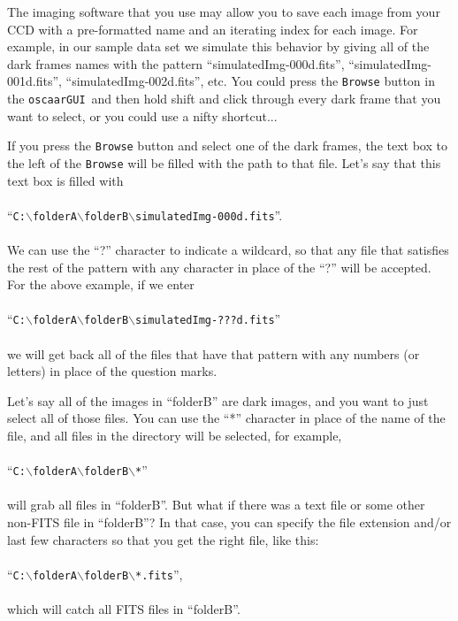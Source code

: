 \documentclass[a4paper]{article}
\newcommand{\code}[1]{\texttt{#1}}
\newcommand{\gui}{\code{oscaarGUI}~}
\begin{document}
The imaging software that you use may allow you to save each image from your CCD with a pre-formatted name and an iterating index for each image. For example, in our sample data set we simulate this behavior by giving all of the dark frames names with the pattern ``simulatedImg-000d.fits'', ``simulatedImg-001d.fits'', ``simulatedImg-002d.fits'', etc. You could press the \code{Browse} button in the \gui and then hold shift and click through every dark frame that you want to select, or you could use a nifty shortcut...

If you press the \code{Browse} button and select one of the dark frames, the text box to the left of the \code{Browse} will be filled with the path to that file. Let's say that this text box is filled with 
\\\\
\noindent``\code{C:$\backslash$folderA$\backslash$folderB$\backslash$simulatedImg-000d.fits}''. 
\\\\
\noindent We can use the ``?'' character to indicate a wildcard, so that any file that satisfies the rest of the pattern with any character in place of the ``?'' will be accepted. For the above example, if we enter 
\\\\
\noindent ``\code{C:$\backslash$folderA$\backslash$folderB$\backslash$simulatedImg-???d.fits}'' 
\\\\
\noindent we will get back all of the files that have that pattern with any numbers (or letters) in place of the question marks. 

Let's say all of the images in ``folderB'' are dark images, and you want to just select all of those files. You can use the ``*'' character in place of the name of the file, and all files in the directory will be selected, for example, 
\\\\
\noindent ``\code{C:$\backslash$folderA$\backslash$folderB$\backslash$*}'' 
\\\\
\noindent will grab all files in ``folderB''. But what if there was a text file or some other non-FITS file in ``folderB''? In that case, you can specify the file extension and/or last few characters so that you get the right file, like this: 
\\\\
\noindent ``\code{C:$\backslash$folderA$\backslash$folderB$\backslash$*.fits}'', 
\\\\
\noindent which will catch all FITS files in ``folderB''.
\end{document}
